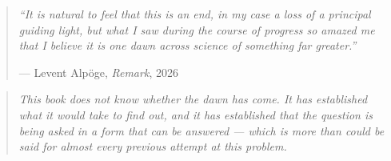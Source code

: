 \vspace{12pt}
\begin{quote}
\small\itshape
``It is natural to feel that this is an end, in my case a loss of a principal
guiding light, but what I saw during the course of progress so amazed me that
I believe it is one dawn across science of something far greater.''
\par
\vspace{6pt}
\hfill --- Levent Alpöge, \emph{Remark}, 2026
\end{quote}

\vspace{8pt}
\begin{quote}
\small\itshape
This book does not know whether the dawn has come. It has established what it
would take to find out, and it has established that the question is being
asked in a form that can be answered --- which is more than could be said for
almost every previous attempt at this problem.
\end{quote}
